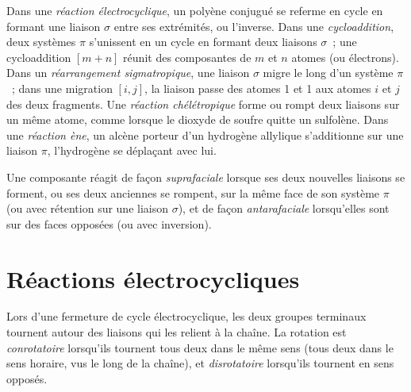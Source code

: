 \begin{definition}\label{def:b3:pericyclic:families}
Dans une \emph{réaction électrocyclique}, un polyène conjugué
se referme en cycle en formant une liaison $\sigma$ entre ses extrémités, ou
l'inverse. Dans une \emph{cycloaddition}, deux systèmes $\pi$ s'unissent
en un cycle en formant deux liaisons $\sigma$~; une cycloaddition $[m + n]$ réunit des composantes
de $m$ et $n$ atomes (ou électrons). Dans un \emph{réarrangement sigmatropique}, une liaison $\sigma$ migre le long d'un système
$\pi$~; dans une migration $[i, j]$, la liaison passe des atomes 1 et 1 aux atomes $i$ et $j$
des deux fragments. Une \emph{réaction chélétropique}
forme ou rompt deux liaisons sur un même atome, comme lorsque le dioxyde de
soufre quitte un sulfolène. Dans une \emph{réaction ène}, un alcène
porteur d'un hydrogène allylique s'additionne sur une liaison $\pi$, l'hydrogène se déplaçant avec lui.
\end{definition}

\begin{definition}\label{def:b3:pericyclic:faciality}
Une composante réagit de façon \emph{suprafaciale} lorsque ses deux
nouvelles liaisons se forment, ou ses deux anciennes se rompent, sur la même face de son système $\pi$ (ou avec
rétention sur une liaison $\sigma$), et de façon \emph{antarafaciale}
lorsqu'elles sont sur des faces opposées (ou avec inversion).
\end{definition}

\section{Réactions électrocycliques}

\begin{definition}\label{def:b3:pericyclic:rotation-modes}
Lors d'une fermeture de cycle électrocyclique, les deux groupes terminaux
tournent autour des liaisons qui les relient à la chaîne. La rotation est
\emph{conrotatoire} lorsqu'ils tournent tous deux dans
le même sens (tous deux dans le sens horaire, vus le long de la chaîne), et
\emph{disrotatoire} lorsqu'ils tournent en sens
opposés.
\end{definition}


